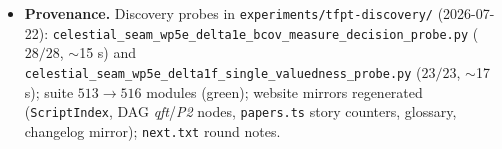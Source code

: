 \documentclass[11pt]{article}
\begin{document}
\begin{itemize}[leftmargin=1.5em]
$J$-weighted closures stay Python-only, flagged in the \texttt{.wl} comment; combined engine
run with the v521/v522 mirrors: extension $522\to540$ (verified, Wolfram Engine 14.3;
\texttt{GATE.WOLFRAM.02}, Wolfram README, \texttt{tfpt\_safeguards}, website counters and
\texttt{zenodo\_description.html} synced $116/116+540/540$).
\item \textbf{Provenance.} Discovery probes in \texttt{experiments/tfpt-discovery/}
(2026-07-22):
\texttt{celestial\_seam\_}\allowbreak\texttt{wp5e\_delta1e\_}\allowbreak\texttt{bcov\_measure\_}\allowbreak\texttt{decision\_probe.py}
($28/28$, $\sim$15 s)
and \texttt{celestial\_seam\_}\allowbreak\texttt{wp5e\_delta1f\_}\allowbreak\texttt{single\_valuedness\_probe.py}
($23/23$, $\sim$17 s); suite $513\to516$ modules (green);
website mirrors regenerated (\texttt{ScriptIndex}, DAG \emph{qft}/\emph{P2} nodes,
\texttt{papers.ts} story counters, glossary, changelog mirror); \texttt{next.txt} round notes.
\end{itemize}
\end{document}
